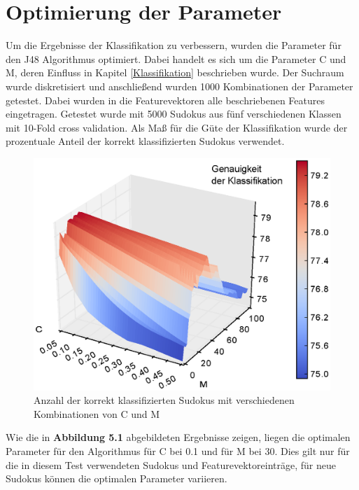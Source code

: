 \section{Optimierung der Parameter}
\label{Parameteroptimierung}
Um die Ergebnisse der Klassifikation zu verbessern, wurden die Parameter für den J48 Algorithmus optimiert. Dabei handelt es sich um die Parameter C und M, deren Einfluss in Kapitel \ref{Klassifikation} beschrieben wurde. Der Suchraum wurde diskretisiert und anschließend wurden 1000 Kombinationen der Parameter getestet. Dabei wurden in die Featurevektoren alle beschriebenen Features eingetragen. Getestet wurde mit 5000 Sudokus aus fünf verschiedenen Klassen mit 10-Fold cross validation. Als Maß für die Güte der Klassifikation wurde der prozentuale Anteil der korrekt klassifizierten Sudokus verwendet.\\

\begin{figure}[H]
    \includegraphics[scale=0.9]{./img/parameter.eps}
    \caption{Anzahl der korrekt klassifizierten Sudokus mit verschiedenen Kombinationen von C und M}
\end{figure}

\noindent Wie die in \textbf{Abbildung 5.1} abgebildeten Ergebnisse zeigen, liegen die optimalen Parameter für den Algorithmus für C bei 0.1 und für M bei 30. Dies gilt nur für die in diesem Test verwendeten Sudokus und Featurevektoreinträge, für neue Sudokus können die optimalen Parameter variieren.